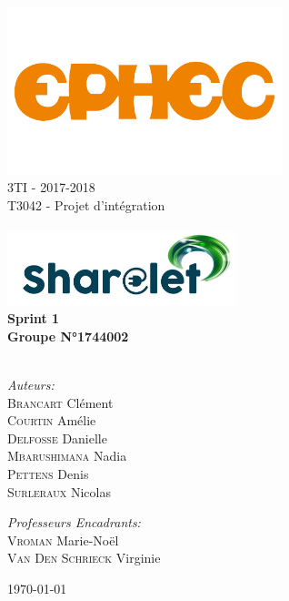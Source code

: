 \begin{titlepage}
\begin{center}

\includegraphics[width=0.6\textwidth]{images/logo-ephec}\\[1cm]
{\large 3TI - 2017-2018}\\[0.5cm]

{\large T3042 - Projet d'intégration}\\[0.8cm]

\HRule \\[0.7cm]
{ 
\includegraphics[width=0.5\textwidth]{images/sharelet.png}\\
}
{\huge \bfseries Sprint 1\\[0.75cm] }
{\bfseries Groupe N°1744002 }\\[1cm]
\HRule \\[2.5cm]

\begin{minipage}{0.4\textwidth}
\begin{flushleft} \large
\emph{Auteurs:}\\
\textsc{Brancart} Clément\\
\textsc{Courtin} Amélie\\
\textsc{Delfosse} Danielle\\
\textsc{Mbarushimana} Nadia\\
\textsc{Pettens} Denis\\
\textsc{Surleraux} Nicolas\\
\end{flushleft}
\end{minipage}
\begin{minipage}{0.4\textwidth}
\begin{flushright} \large
\emph{Professeurs Encadrants:} \\
\textsc{Vroman} Marie-Noël \\
\textsc{Van Den Schrieck} Virginie \\
\end{flushright}
\end{minipage}

\vfill

{\large \today}

\end{center}
\end{titlepage}